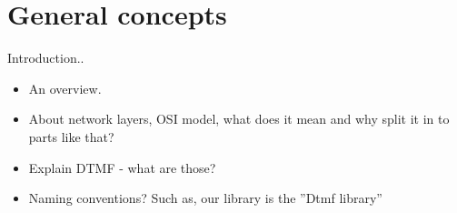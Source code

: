 \chapter{General concepts}
Introduction..
\begin{itemize}
 \item An overview.
 \item About network layers, OSI model, what does it mean and why split it in to parts like that?
 \item Explain DTMF - what are those?
 \item Naming conventions? Such as, our library is the ''Dtmf library''
\end{itemize}
